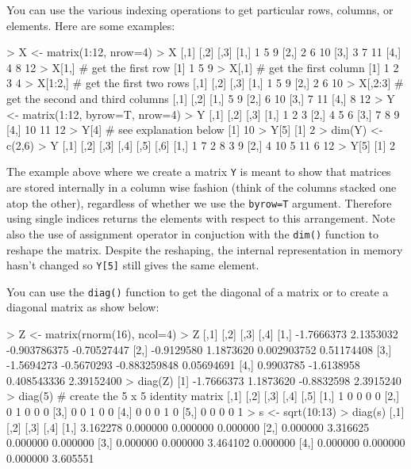 You can use the various indexing operations to get particular rows,
columns, or elements. Here are some examples:
%
\begin{R}
> X <- matrix(1:12, nrow=4)
> X
     [,1] [,2] [,3]
[1,]    1    5    9
[2,]    2    6   10
[3,]    3    7   11
[4,]    4    8   12
> X[1,] # get the first row
[1] 1 5 9
> X[,1] # get the first column
[1] 1 2 3 4
> X[1:2,] # get the first two rows
     [,1] [,2] [,3]
[1,]    1    5    9
[2,]    2    6   10
> X[,2:3] # get the second and third columns
     [,1] [,2]
[1,]    5    9
[2,]    6   10
[3,]    7   11
[4,]    8   12
> Y <- matrix(1:12, byrow=T, nrow=4)
> Y
     [,1] [,2] [,3]
[1,]    1    2    3
[2,]    4    5    6
[3,]    7    8    9
[4,]   10   11   12
> Y[4] # see explanation below
[1] 10
> Y[5]
[1] 2
> dim(Y) <- c(2,6)
> Y
     [,1] [,2] [,3] [,4] [,5] [,6]
[1,]    1    7    2    8    3    9
[2,]    4   10    5   11    6   12
> Y[5]
[1] 2
\end{R}
%
The example above where we create a matrix \lstinline!Y! is meant to
show that matrices are stored internally in a column wise fashion (think
of the columns stacked one atop the other), regardless of whether we use
the \lstinline!byrow=T! argument. Therefore using single indices returns
the elements with respect to this arrangement. Note also the use of
assignment operator in conjuction with the \lstinline!dim()! function to
reshape the matrix. Despite the reshaping, the internal representation
in memory hasn't changed so \lstinline!Y[5]! still gives the same
element.

You can use the \lstinline!diag()! function to get the diagonal of a
matrix or to create a diagonal matrix as show below:

\begin{R}
> Z <- matrix(rnorm(16), ncol=4)
> Z
           [,1]       [,2]         [,3]        [,4]
[1,] -1.7666373  2.1353032 -0.903786375 -0.70527447
[2,] -0.9129580  1.1873620  0.002903752  0.51174408
[3,] -1.5694273 -0.5670293 -0.883259848  0.05694691
[4,]  0.9903785 -1.6138958  0.408543336  2.39152400
> diag(Z)
[1] -1.7666373  1.1873620 -0.8832598  2.3915240
> diag(5) # create the 5 x 5 identity matrix
     [,1] [,2] [,3] [,4] [,5]
[1,]    1    0    0    0    0
[2,]    0    1    0    0    0
[3,]    0    0    1    0    0
[4,]    0    0    0    1    0
[5,]    0    0    0    0    1
> s <- sqrt(10:13)
> diag(s)
         [,1]     [,2]     [,3]     [,4]
[1,] 3.162278 0.000000 0.000000 0.000000
[2,] 0.000000 3.316625 0.000000 0.000000
[3,] 0.000000 0.000000 3.464102 0.000000
[4,] 0.000000 0.000000 0.000000 3.605551
\end{R}


